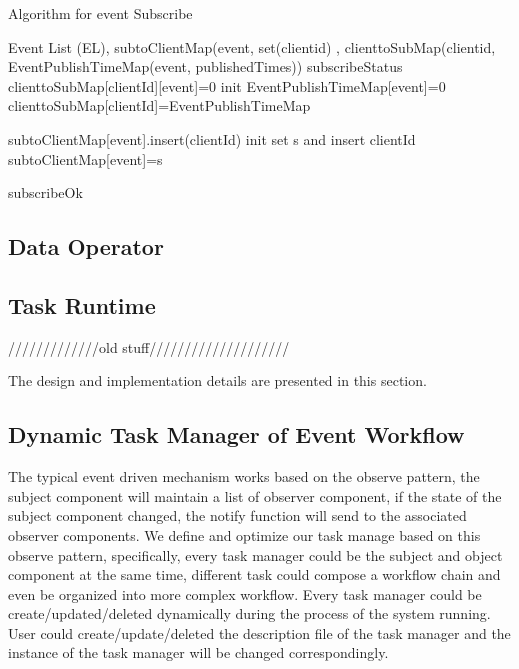  \begin{algorithm}
 \caption{Algorithm for event Subscribe}
 \begin{algorithmic}[1]
 \renewcommand{\algorithmicrequire}{\textbf{Input:}}
 \renewcommand{\algorithmicensure}{\textbf{Output:}}
 \REQUIRE 
 Event List (EL), subtoClientMap(event, set(clientid) , clienttoSubMap(clientid, EventPublishTimeMap(event, publishedTimes))
 \ENSURE  subscribeStatus
  \STATE clienttoSubMap[clientId][event]=0
  \ELSE
  \STATE init EventPublishTimeMap[event]=0
  \STATE clienttoSubMap[clientId]=EventPublishTimeMap
  \ENDIF


   \STATE subtoClientMap[event].insert(clientId)
  \ELSE
   \STATE init set s and insert clientId
   \STATE subtoClientMap[event]=s
  \ENDIF

 \ENDFOR

 \RETURN subscribeOk
 \end{algorithmic} 
 \end{algorithm}



\subsection{Data Operator}


\subsection{Task Runtime}



/////////////old stuff////////////////////

The design and implementation details are presented in this section.
\subsection{Dynamic Task Manager of Event Workflow}
The typical event driven mechanism works based on the observe pattern, the subject component will maintain a list of observer component, if the state of the subject component changed, the notify function will send to the associated observer components. We define and optimize our task manage based on this observe pattern, specifically, every task manager could be the subject and object component at the same time, different task could compose a workflow chain and even be organized into more complex workflow. Every task manager could be create/updated/deleted dynamically during the process of the system running. User could create/update/deleted the description file of the task manager and the instance of the task manager will be changed correspondingly.


